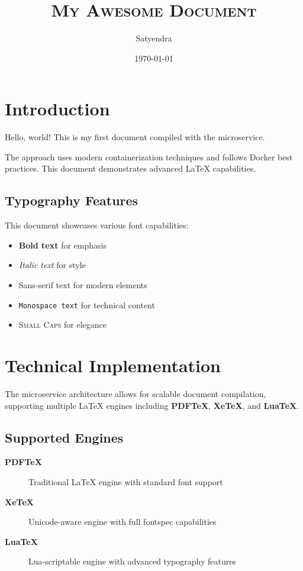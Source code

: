 \documentclass{article}
\title{\textsc{My Awesome Document}}
\author{\textsf{Satyendra}}
\date{\today}
\begin{document}
\maketitle

\section{Introduction}

Hello, world! This is my first document compiled with the microservice\cite{microservice2025}. 

The approach uses modern containerization techniques\cite{containerization2024} and follows Docker best practices\cite{docker2023}. This document demonstrates advanced LaTeX capabilities\cite{latex2024}.

\subsection{Typography Features}

This document showcases various font capabilities:
\begin{itemize}
    \item \textbf{Bold text} for emphasis
    \item \textit{Italic text} for style  
    \item \textsf{Sans-serif text} for modern elements
    \item \texttt{Monospace text} for technical content
    \item \textsc{Small Caps} for elegance
\end{itemize}

\section{Technical Implementation}

The microservice architecture allows for scalable document compilation, supporting multiple LaTeX engines including \textbf{PDFTeX}, \textbf{XeTeX}, and \textbf{LuaTeX}.

\subsection{Supported Engines}

\begin{description}
    \item[\textsf{\textbf{PDFTeX}}] Traditional LaTeX engine with standard font support
    \item[\textsf{\textbf{XeTeX}}] Unicode-aware engine with full fontspec capabilities  
    \item[\textsf{\textbf{LuaTeX}}] Lua-scriptable engine with advanced typography features
\end{description}
\end{document}
